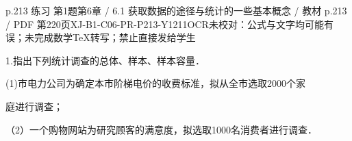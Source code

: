 \begin{bankitem}{p.213 练习 第1题}{第6章 / 6.1 获取数据的途径与统计的一些基本概念 / 教材 p.213 / PDF 第220页}{XJ-B1-C06-PR-P213-Y1211}{OCR未校对：公式与文字均可能有误；未完成数学TeX转写；禁止直接发给学生}
\begin{ocrdraft}
\par
1.指出下列统计调查的总体、样本、样本容量．
\par
(1)市电力公司为确定本市阶梯电价的收费标准，拟从全市选取2000个家
\par
庭进行调查；
\par
（2）一个购物网站为研究顾客的满意度，拟选取1000名消费者进行调查．
\end{ocrdraft}
\end{bankitem}
